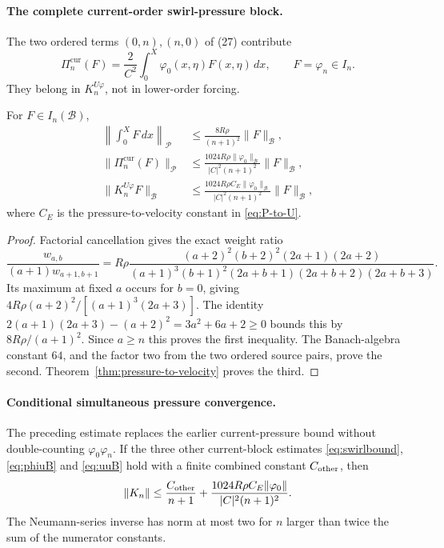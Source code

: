 \paragraph{The complete current-order swirl-pressure block.}
The two ordered terms $(0,n),(n,0)$ of (27) contribute
\begin{equation}\label{eq:current-pressure-identity}
\Pi_n^{\mathrm{cur}}(F)
=\frac2{C^2}\int_0^X\varphi_0(x,\eta)F(x,\eta)\,dx,
\qquad F=\varphi_n\in I_n.
\end{equation}
They belong in $K_n^{U\varphi}$, not in lower-order forcing.
\begin{lemma}
\label{lem:current-pressure-quadratic}
For $F\in I_n(\mathcal B)$,
\begin{align}
\left\|\int_0^X F\,dx\right\|_{\mathcal P}
&\le\frac{8R\rho}{(n+1)^2}\|F\|_{\mathcal B},\label{eq:axis-primitive-n2}\\
\|\Pi_n^{\mathrm{cur}}(F)\|_{\mathcal P}
&\le\frac{1024R\rho\|\varphi_0\|_{\mathcal B}}
{|C|^2(n+1)^2}\|F\|_{\mathcal B},\label{eq:current-pressure-n2}\\
\|K_n^{U\varphi}F\|_{\mathcal B}
&\le\frac{1024R\rho C_E\|\varphi_0\|_{\mathcal B}}
{|C|^2(n+1)^2}\|F\|_{\mathcal B},\label{eq:current-block-n2}
\end{align}
where $C_E$ is the pressure-to-velocity constant in
\eqref{eq:P-to-U}.
\end{lemma}
\begin{proof}
Factorial cancellation gives the exact weight ratio
\[
\frac{w_{a,b}}{(a+1)w_{a+1,b+1}}
=R\rho\frac{(a+2)^2(b+2)^2(2a+1)(2a+2)}
{(a+1)^3(b+1)^2(2a+b+1)(2a+b+2)(2a+b+3)}.
\]
Its maximum at fixed $a$ occurs for $b=0$, giving
$4R\rho(a+2)^2/[(a+1)^3(2a+3)]$.
The identity
$2(a+1)(2a+3)-(a+2)^2=3a^2+6a+2\ge0$
bounds this by $8R\rho/(a+1)^2$.
Since $a\ge n$ this proves the first inequality.
The Banach-algebra constant $64$, and the factor two
from the two ordered source pairs, prove the second.
Theorem~\ref{thm:pressure-to-velocity} proves the third.
\end{proof}

\paragraph{Conditional simultaneous pressure convergence.}
The preceding estimate replaces the earlier current-pressure
bound without double-counting $\varphi_0\varphi_n$.
If the three other current-block estimates
\eqref{eq:swirlbound}, \eqref{eq:phiuB} and \eqref{eq:uuB}
hold with a finite combined constant $C_{\rm other}$,
then
\begin{equation}\label{eq:current-K-updated}
\|K_n\|\le\frac{C_{\rm other}}{n+1}
+\frac{1024R\rho C_E\|\varphi_0\|}
{|C|^2(n+1)^2}.
\end{equation}
The Neumann-series inverse has norm at most two for
$n$ larger than twice the sum of the numerator constants.

